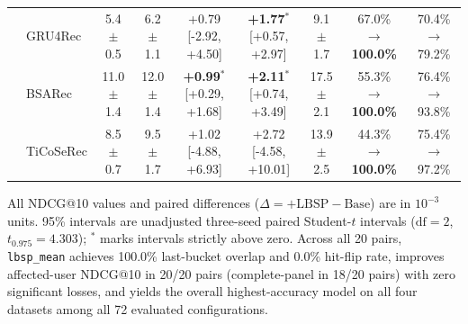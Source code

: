 \begin{table}[!htbp]
\begin{tabular*}{\textwidth}{@{\extracolsep{\fill}}llccccccc@{}}
 & GRU4Rec & 5.4 $\pm$ 0.5 & 6.2 $\pm$ 1.1 & +0.79 \scriptsize{[-2.92, +4.50]} & \textbf{+1.77$^{*}$} \scriptsize{[+0.57, +2.97]} & 9.1 $\pm$ 1.7 & 67.0\% $\to$ \textbf{100.0\%} & 70.4\% $\to$ 79.2\% \\
 & BSARec & 11.0 $\pm$ 1.4 & 12.0 $\pm$ 1.4 & \textbf{+0.99$^{*}$} \scriptsize{[+0.29, +1.68]} & \textbf{+2.11$^{*}$} \scriptsize{[+0.74, +3.49]} & 17.5 $\pm$ 2.1 & 55.3\% $\to$ \textbf{100.0\%} & 76.4\% $\to$ 93.8\% \\
 & TiCoSeRec & 8.5 $\pm$ 0.7 & 9.5 $\pm$ 1.7 & +1.02 \scriptsize{[-4.88, +6.93]} & +2.72 \scriptsize{[-4.58, +10.01]} & 13.9 $\pm$ 2.5 & 44.3\% $\to$ \textbf{100.0\%} & 75.4\% $\to$ 97.2\% \\
\bottomrule
\end{tabular*}
\par\smallskip\noindent\begin{minipage}{\textwidth}\fontsize{8}{10}\selectfont All NDCG@10 values and paired differences ($\Delta = \text{+LBSP} - \text{Base}$) are in $10^{-3}$ units. 95\% intervals are unadjusted three-seed paired Student-$t$ intervals ($\text{df}=2$, $t_{0.975}=4.303$); $^{*}$ marks intervals strictly above zero. Across all 20 pairs, \texttt{lbsp\_mean} achieves 100.0\% last-bucket overlap and 0.0\% hit-flip rate, improves affected-user NDCG@10 in 20/20 pairs (complete-panel in 18/20 pairs) with zero significant losses, and yields the overall highest-accuracy model on all four datasets among all 72 evaluated configurations.
\end{minipage}
\end{table}
